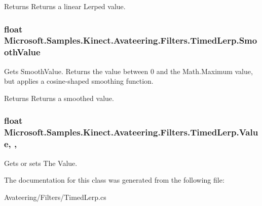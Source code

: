 \begin{DoxyReturn}{Returns}
Returns a linear Lerped value.
\end{DoxyReturn}
\hypertarget{class_microsoft_1_1_samples_1_1_kinect_1_1_avateering_1_1_filters_1_1_timed_lerp_a6dcdd78c7c307469b295ae76b5b41eda}{
\subsubsection[{Smooth\+Value}]{\setlength{\rightskip}{0pt plus 5cm}float Microsoft.\+Samples.\+Kinect.\+Avateering.\+Filters.\+Timed\+Lerp.\+Smooth\+Value\hspace{0.3cm}{\ttfamily [get]}}}\label{class_microsoft_1_1_samples_1_1_kinect_1_1_avateering_1_1_filters_1_1_timed_lerp_a6dcdd78c7c307469b295ae76b5b41eda}


Gets Smooth\+Value. Returns the value between 0 and the Math.\+Maximum value, but applies a cosine-\/shaped smoothing function. 

\begin{DoxyReturn}{Returns}
Returns a smoothed value.
\end{DoxyReturn}
\hypertarget{class_microsoft_1_1_samples_1_1_kinect_1_1_avateering_1_1_filters_1_1_timed_lerp_a5f0d73e5e719721431fe9aa90b863788}{
\subsubsection[{Value}]{\setlength{\rightskip}{0pt plus 5cm}float Microsoft.\+Samples.\+Kinect.\+Avateering.\+Filters.\+Timed\+Lerp.\+Value\hspace{0.3cm}{\ttfamily [get]}, {\ttfamily [set]}, {\ttfamily [protected]}}}\label{class_microsoft_1_1_samples_1_1_kinect_1_1_avateering_1_1_filters_1_1_timed_lerp_a5f0d73e5e719721431fe9aa90b863788}


Gets or sets The Value. 



The documentation for this class was generated from the following file\+:\begin{DoxyCompactItemize}
\item 
Avateering/\+Filters/Timed\+Lerp.\+cs\end{DoxyCompactItemize}
